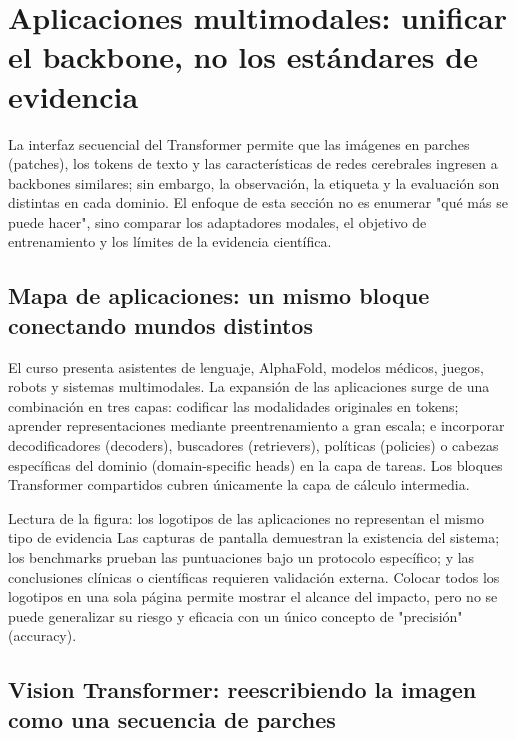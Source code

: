 \section{Aplicaciones multimodales: unificar el backbone, no los estándares de evidencia}

La interfaz secuencial del Transformer permite que las imágenes en parches (patches), los tokens de texto y las características de redes cerebrales ingresen a backbones similares; sin embargo, la observación, la etiqueta y la evaluación son distintas en cada dominio. El enfoque de esta sección no es enumerar "qué más se puede hacer", sino comparar los adaptadores modales, el objetivo de entrenamiento y los límites de la evidencia científica.

\subsection{Mapa de aplicaciones: un mismo bloque conectando mundos distintos}

El curso presenta asistentes de lenguaje, AlphaFold, modelos médicos, juegos, robots y sistemas multimodales. La expansión de las aplicaciones surge de una combinación en tres capas: codificar las modalidades originales en tokens; aprender representaciones mediante preentrenamiento a gran escala; e incorporar decodificadores (decoders), buscadores (retrievers), políticas (policies) o cabezas específicas del dominio (domain-specific heads) en la capa de tareas. Los bloques Transformer compartidos cubren únicamente la capa de cálculo intermedia.


\begin{knowledgebox}{Lectura de la figura: los logotipos de las aplicaciones no representan el mismo tipo de evidencia}
Las capturas de pantalla demuestran la existencia del sistema; los benchmarks prueban las puntuaciones bajo un protocolo específico; y las conclusiones clínicas o científicas requieren validación externa. Colocar todos los logotipos en una sola página permite mostrar el alcance del impacto, pero no se puede generalizar su riesgo y eficacia con un único concepto de "precisión" (accuracy).
\end{knowledgebox}

\subsection{Vision Transformer: reescribiendo la imagen como una secuencia de parches}

